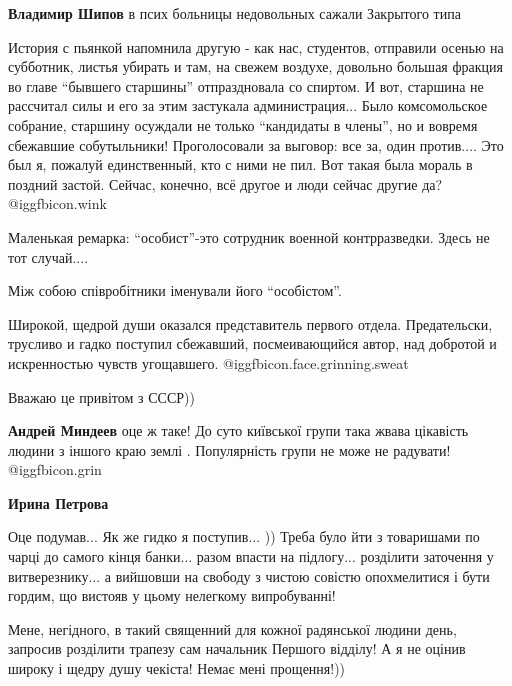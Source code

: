 \begin{itemize}
\begin{itemize}
\textbf{Владимир Шипов} в псих больницы недовольных сажали Закрытого типа
\end{itemize} %


История с пьянкой напомнила другую - как нас, студентов, отправили осенью на
субботник, листья убирать и там, на свежем воздухе, довольно большая фракция во
главе \enquote{бывшего старшины} отпраздновала со спиртом. И вот, старшина не
рассчитал силы и его за этим застукала администрация... Было комсомольское
собрание, старшину осуждали не только \enquote{кандидаты в члены}, но и вовремя
сбежавшие собутыльники! Проголосовали за выговор: все за, один против.... Это
был я, пожалуй единственный, кто с ними не пил. Вот такая была мораль в поздний
застой. Сейчас, конечно, всё другое и люди сейчас другие да?  @igg{fbicon.wink} 



Маленькая ремарка: \enquote{особист}-это сотрудник военной контрразведки. Здесь не тот
случай....


Між собою співробітники іменували його \enquote{особістом}.


Широкой, щедрой души оказался представитель первого отдела. Предательски, трусливо
и гадко поступил сбежавший, посмеивающийся автор, над добротой и искренностью
чувств угощавшего. @igg{fbicon.face.grinning.sweat} 

\begin{itemize} %

Вважаю це привітом з СССР))

\textbf{Андрей Миндеев} оце ж таке! До суто київської групи така жвава цікавість людини з іншого краю землі . Популярність групи не може не радувати! @igg{fbicon.grin} 

\begin{itemize} %
\textbf{Ирина Петрова} 

Оце подумав... Як же гидко я поступив... )) Треба було йти з товаришами по
чарці до самого кінця банки... разом впасти на підлогу... розділити заточення у
витверезнику... а вийшовши на свободу з чистою совістю опохмелитися і бути
гордим, що вистояв у цьому нелегкому випробуванні!

Мене, негідного, в такий священний для кожної радянської людини день, запросив
розділити трапезу сам начальник Першого відділу! А я не оцінив широку і щедру
душу чекіста! Немає мені прощення!))


\end{itemize}
\end{itemize}
\end{itemize}
